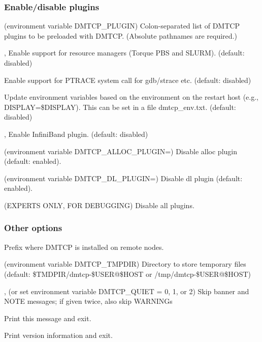 \subsubsection{Enable/disable plugins}
\begin{Description}
  \item[\OptSArg{--with-plugin}{plugins} (environment variable DMTCP_PLUGIN)]
    Colon-separated list of DMTCP plugins to be preloaded with DMTCP.
    (Absolute pathnames are required.)

  \item[\Opt{--batch-queue}, \Opt{--rm}]
    Enable support for resource managers (Torque PBS and SLURM).
    (default: disabled)

  \item[\Opt{--ptrace}]
    Enable support for PTRACE system call for gdb/strace etc. (default: disabled)

  \item[\Opt{--modify-env}]
    Update environment variables based on the environment on the restart host
    (e.g., DISPLAY=\$DISPLAY).  This can be set in a file dmtcp_env.txt.
    (default: disabled)

  \item[\Opt{--ib}, \Opt{--infiniband}]
    Enable InfiniBand plugin. (default: disabled)

  \item[\Opt{--disable-alloc-plugin} (environment variable DMTCP_ALLOC_PLUGIN=\Lbr01\Rbr)]
    Disable alloc plugin (default: enabled).

  \item[\Opt{--disable-dl-plugin} (environment variable DMTCP_DL_PLUGIN=\Lbr01\Rbr)]
    Disable dl plugin (default: enabled).

  \item[\Opt{--disable-all-plugins} (EXPERTS ONLY, FOR DEBUGGING)]
    Disable all plugins.
\end{Description}

\subsubsection{Other options}
\begin{Description}
  \item[\OptSArg{--prefix}{path}]
    Prefix where DMTCP is installed on remote nodes.

  \item[\OptSArg{--tmpdir}{path} (environment variable DMTCP_TMPDIR)]
    Directory to store temporary files
    (default: \$TMDPIR/dmtcp-\$USER@\$HOST or /tmp/dmtcp-\$USER@\$HOST)

  \item[\Opt{-q}, \Opt{--quiet} (or set environment variable DMTCP_QUIET = 0, 1, or 2)]
    Skip banner and NOTE messages; if given twice, also skip WARNINGs

  \item[\Opt{--help}] Print this message and exit.

  \item[\Opt{--version}] Print version information and exit.
\end{Description}
